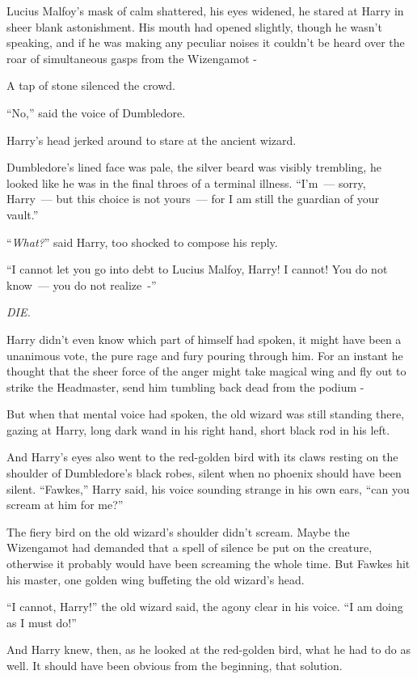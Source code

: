 Lucius Malfoy's mask of calm shattered, his eyes widened, he stared at Harry in sheer blank astonishment. His mouth had opened slightly, though he wasn't speaking, and if he was making any peculiar noises it couldn't be heard over the roar of simultaneous gasps from the Wizengamot -

A tap of stone silenced the crowd.

``No,'' said the voice of Dumbledore.

Harry's head jerked around to stare at the ancient wizard.

Dumbledore's lined face was pale, the silver beard was visibly trembling, he looked like he was in the final throes of a terminal illness. ``I'm~--- sorry, Harry~--- but this choice is not yours~--- for I am still the guardian of your vault.''

``\emph{What?}'' said Harry, too shocked to compose his reply.

``I cannot let you go into debt to Lucius Malfoy, Harry! I cannot! You do not know~--- you do not realize~-''

\emph{DIE.}

Harry didn't even know which part of himself had spoken, it might have been a unanimous vote, the pure rage and fury pouring through him. For an instant he thought that the sheer force of the anger might take magical wing and fly out to strike the Headmaster, send him tumbling back dead from the podium -

But when that mental voice had spoken, the old wizard was still standing there, gazing at Harry, long dark wand in his right hand, short black rod in his left.

And Harry's eyes also went to the red-golden bird with its claws resting on the shoulder of Dumbledore's black robes, silent when no phoenix should have been silent. ``Fawkes,'' Harry said, his voice sounding strange in his own ears, ``can you scream at him for me?''

The fiery bird on the old wizard's shoulder didn't scream. Maybe the Wizengamot had demanded that a spell of silence be put on the creature, otherwise it probably would have been screaming the whole time. But Fawkes hit his master, one golden wing buffeting the old wizard's head.

``I cannot, Harry!'' the old wizard said, the agony clear in his voice. ``I am doing as I must do!''

And Harry knew, then, as he looked at the red-golden bird, what he had to do as well. It should have been obvious from the beginning, that solution.

